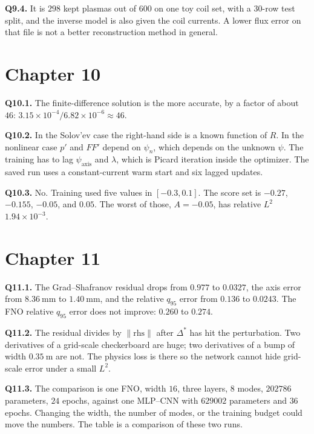 \documentclass[11pt,a4paper,oneside,openany]{book}
\numberwithin{equation}{chapter}
\newcommand{\Dstar}{\Delta^{*}}
\newcommand{\psin}{\psi_{n}}
\theoremstyle{definition}
\begin{document}
\textbf{Q9.4.} It is \(298\) kept plasmas out of \(600\) on one toy coil set, with a \(30\)-row test split, and the inverse model is also given the coil currents. A lower flux error on that file is not a better reconstruction method in general.

\section*{Chapter 10}

\textbf{Q10.1.} The finite-difference solution is the more accurate, by a factor of about \(46\): \(3.15\times 10^{-4}/6.82\times 10^{-6}\approx 46\).

\textbf{Q10.2.} In the Solov'ev case the right-hand side is a known function of \(R\). In the nonlinear case \(p'\) and \(FF'\) depend on \(\psin\), which depends on the unknown \(\psi\). The training has to lag \(\psi_{\mathrm{axis}}\) and \(\lambda\), which is Picard iteration inside the optimizer. The saved run uses a constant-current warm start and six lagged updates.

\textbf{Q10.3.} No. Training used five values in \([-0.3,0.1]\). The score set is \(-0.27\), \(-0.155\), \(-0.05\), and \(0.05\). The worst of those, \(A=-0.05\), has relative \(L^{2}\) \(1.94\times 10^{-3}\).

\section*{Chapter 11}

\textbf{Q11.1.} The Grad--Shafranov residual drops from \(0.977\) to \(0.0327\), the axis error from \(\qty{8.36}{\milli\metre}\) to \(\qty{1.40}{\milli\metre}\), and the relative \(q_{95}\) error from \(0.136\) to \(0.0243\). The FNO relative \(q_{95}\) error does not improve: \(0.260\) to \(0.274\).

\textbf{Q11.2.} The residual divides by \(\lVert\mathrm{rhs}\rVert\) after \(\Dstar\) has hit the perturbation. Two derivatives of a grid-scale checkerboard are huge; two derivatives of a bump of width \(\qty{0.35}{\metre}\) are not. The physics loss is there so the network cannot hide grid-scale error under a small \(L^{2}\).

\textbf{Q11.3.} The comparison is one FNO, width \(16\), three layers, \(8\) modes, \(202786\) parameters, \(24\) epochs, against one MLP--CNN with \(629002\) parameters and \(36\) epochs. Changing the width, the number of modes, or the training budget could move the numbers. The table is a comparison of these two runs.
\end{document}
